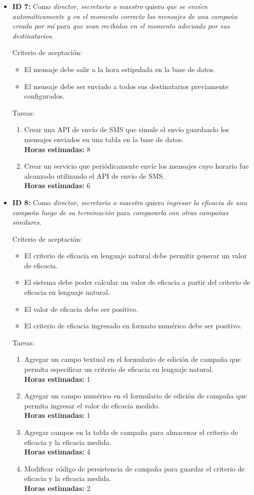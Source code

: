 \documentclass[a4paper, 10pt, twoside]{article}
\newenvironment{stories}{
  \begin{itemize}
}{
  \end{itemize}
}
\newcommand{\storyid}[4]{
  \item
  \textbf{ID #1:} Como \emph{#2} quiero \emph{#3} para \emph{#4}.
}
\newenvironment{tasks}{
  Tareas:
  \begin{enumerate}
}{
  \end{enumerate}
}
\newcommand{\task}[1] {
  \item #1.\\
  \textbf{Horas estimadas:}
}
\newenvironment{criterios}{
  Criterio de aceptación:
  \begin{itemize}
}{
  \end{itemize}
}
\newcommand{\criteria}[1] {
  \item #1
}
\begin{document}
\begin{stories}
  \begin{tasks}
    \task{Crear una interfaz que liste todas las campañas creadas por el usuario actual} 3
    \task{Crear interacción que muestre el formulario de edición de la campaña cuando se la selecciona en la lista anterior} 2
    \task{Modificar formulario de edición de campaña y sus componentes para que tenga precargados los datos de una campaña existente y permita modificarla} 0.5
    \task{Modificar código de persistencia de campañas para que permita guardar cambios en una campaña existente} 0.5
  \end{tasks}


  \storyid{7}{director, secretario o maestro}
             {que se envíen automáticamente y en el momento correcto los mensajes de una campaña creada por mí}
             {que sean recibidos en el momento adecuado por sus destinatarios}
  
   \begin{criterios}
  	\criteria{El mensaje debe salir a la hora estipulada en la base de datos.}
    \criteria{El mensaje debe ser enviado a todos sus destinatarios previamente configurados.}
  \end{criterios} 

  \begin{tasks}
    \task{Crear una API de envío de SMS que simule el envío guardando los mensajes enviados en una tabla en la base de datos} 8
    \task{Crear un servicio que periódicamente envíe los mensajes cuyo horario fue alcanzado utilizando el API de envío de SMS} 6
  \end{tasks}


  \storyid{8}{director, secretario o maestro}
             {ingresar la eficacia de una campaña luego de su terminación}
             {compararla con otras campañas similares}
        
   \begin{criterios}
  	\criteria{El criterio de eficacia en lenguaje natural debe permitir generar un valor de eficacia.}
    \criteria{El sistema debe poder calcular un valor de eficacia a partir del criterio de eficacia en lenguaje natural.}
    \criteria{El valor de eficacia debe ser positivo.}
    \criteria{El criterio de eficacia ingresado en formato numérico debe ser positivo.}
  \end{criterios} 

  \begin{tasks}
    \task{Agregar un campo textual en el formulario de edición de campaña que permita especificar un criterio de eficacia en lenguaje natural} 1
    \task{Agregar un campo numérico en el formulario de edición de campaña que permita ingresar el valor de eficacia medido} 1
    \task{Agregar campos en la tabla de campaña para almacenar el criterio de eficacia y la eficacia medida} 4
    \task{Modificar código de persistencia de campaña para guardar el criterio de eficacia y la eficacia medida} 2
  \end{tasks}
\end{stories}
\end{document}
